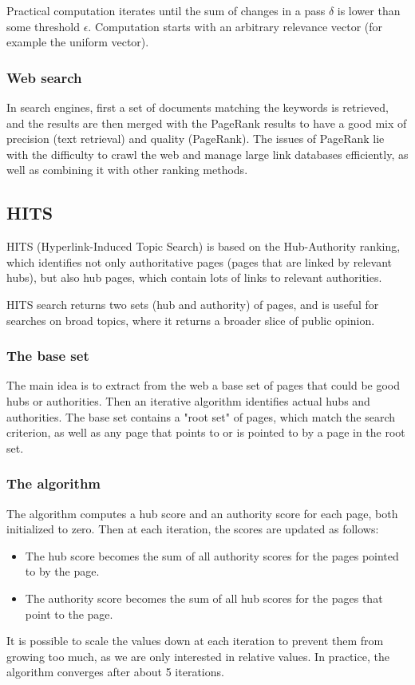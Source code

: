 Practical computation iterates until the sum of changes in a pass $\delta$ is lower than some threshold $\epsilon$. Computation starts with an arbitrary relevance vector (for example the uniform vector).

\subsubsection{Web search}

In search engines, first a set of documents matching the keywords is retrieved, and the results are then merged with the PageRank results to have a good mix of precision (text retrieval) and quality (PageRank).
The issues of PageRank lie with the difficulty to crawl the web and manage large link databases efficiently, as well as combining it with other ranking methods.

\subsection{HITS}

HITS (Hyperlink-Induced Topic Search) is based on the Hub-Authority ranking, which identifies not only authoritative pages (pages that are linked by relevant hubs), but also hub pages, which contain lots of links to relevant authorities.

HITS search returns two sets (hub and authority) of pages, and is useful for searches on broad topics, where it returns a broader slice of public opinion.

\subsubsection{The base set}

The main idea is to extract from the web a base set of pages that could be good hubs or authorities. Then an iterative algorithm identifies actual hubs and authorities.
The base set contains a "root set" of pages, which match the search criterion, as well as any page that points to or is pointed to by a page in the root set.

\subsubsection{The algorithm}

The algorithm computes a hub score and an authority score for each page, both initialized to zero. Then at each iteration, the scores are updated as follows:
\begin{itemize}
\item The hub score becomes the sum of all authority scores for the pages pointed to by the page.
\item The authority score becomes the sum of all hub scores for the pages that point to the page.
\end{itemize}
It is possible to scale the values down at each iteration to prevent them from growing too much, as we are only interested in relative values.
In practice, the algorithm converges after about 5 iterations.

